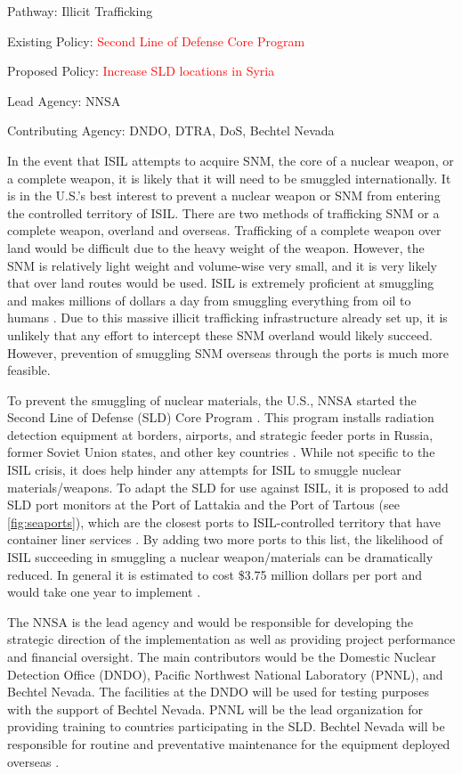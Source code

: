 \documentclass{report}
\begin{document}
Pathway: Illicit Trafficking 

Existing Policy: \textcolor{red}{Second Line of Defense Core Program} 

Proposed Policy: \textcolor{red}{Increase SLD locations in Syria}

Lead Agency: NNSA

Contributing Agency: DNDO, DTRA, DoS, Bechtel Nevada  \normalfont



In the event that ISIL attempts to acquire SNM, the core of a nuclear weapon, or a complete weapon, it is likely that it will need to be smuggled internationally. It is in the U.S.'s best interest to prevent a nuclear weapon or SNM from entering the controlled territory of ISIL. There are two methods of trafficking SNM or a complete weapon, overland and overseas. Trafficking of a complete weapon over land would be difficult due to the heavy weight of the weapon. However, the SNM is relatively light weight and volume-wise very small, and it is very likely that over land routes would be used. ISIL is extremely proficient at smuggling and makes millions of dollars a day from smuggling everything from oil to humans \cite{Amos2014}. Due to this massive illicit trafficking infrastructure already set up, it is unlikely that any effort to intercept these SNM overland would likely succeed. However, prevention of smuggling SNM overseas through the ports is much more feasible. 

To prevent the smuggling of nuclear materials, the U.S., NNSA started the Second Line of Defense (SLD) Core Program  \cite{Kilmartin2010}. This program installs radiation detection equipment at borders, airports, and strategic feeder ports in Russia, former Soviet Union states, and other key countries \cite{Kilmartin2010}. While not specific to the ISIL crisis, it does help hinder any attempts for ISIL to smuggle nuclear materials/weapons. To adapt the SLD for use against ISIL, it is proposed to add SLD port monitors at the Port of Lattakia and the Port of Tartous (see \autoref{fig:seaports}), which are the closest ports to ISIL-controlled territory that have container liner services \cite{WorldPortSource2005}.  By adding two more ports to this list, the likelihood of ISIL succeeding in smuggling a nuclear weapon/materials can be dramatically reduced. In general it is estimated to cost \$3.75 million dollars per port and would take one year to implement \cite{Aloise2005}. 

The NNSA is the lead agency and would be responsible for developing the strategic direction of the implementation as well as providing project performance and financial oversight. The main contributors would be the Domestic Nuclear Detection Office (DNDO), Pacific Northwest National Laboratory (PNNL), and Bechtel Nevada. The facilities at the DNDO will be used for testing purposes with the support of Bechtel Nevada. PNNL will be the lead organization for providing training to countries participating in the SLD. Bechtel Nevada will be responsible for routine and preventative maintenance for the equipment deployed overseas \cite{NationalNuclearSecurityAdministration2006}. 
\end{document}
